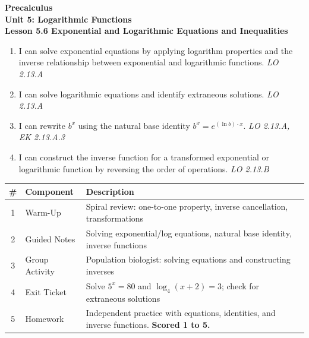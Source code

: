 \documentclass[10pt]{article}
\begin{document}
\vspace{-0.8in}

\begin{center}
  {\color{white}\textbf{\LARGE Precalculus}}\\[4pt]
  {\color{skymid}\large\textbf{Unit 5: Logarithmic Functions}}\\[6pt]
  {\color{white}\textbf{\large Lesson 5.6 \quad Exponential and Logarithmic Equations and Inequalities}}
\end{center}

\vspace{0.22in}
\namedateperiod
\vspace{0.18in}

\begin{learningtargetbox}
\small
\begin{enumerate}[leftmargin=1.5em, itemsep=5pt]
  \item I can solve exponential equations by applying logarithm properties and the inverse
        relationship between exponential and logarithmic functions.
        \hfill\textit{LO 2.13.A}
  \item I can solve logarithmic equations and identify extraneous solutions.
        \hfill\textit{LO 2.13.A}
  \item I can rewrite $b^x$ using the natural base identity $b^x = e^{(\ln b)\cdot x}$.
        \hfill\textit{LO 2.13.A, EK 2.13.A.3}
  \item I can construct the inverse function for a transformed exponential or logarithmic
        function by reversing the order of operations.
        \hfill\textit{LO 2.13.B}
\end{enumerate}
\end{learningtargetbox}

\vspace{0.14in}

\begin{tocbox}
\small
\renewcommand{\arraystretch}{1.5}
\begin{tabularx}{\linewidth}{@{} c l X @{}}
\rowcolor{sky}
\textbf{\#} & \textbf{Component} & \textbf{Description} \\
\midrule
1 & Warm-Up        & Spiral review: one-to-one property, inverse cancellation, transformations \\
2 & Guided Notes   & Solving exponential/log equations, natural base identity, inverse functions \\
3 & Group Activity & Population biologist: solving equations and constructing inverses \\
4 & Exit Ticket    & Solve $5^x = 80$ and $\log_4(x+2)=3$; check for extraneous solutions \\
5 & Homework       & Independent practice with equations, identities, and inverse functions. \textbf{Scored 1 to 5.} \\
\end{tabularx}
\end{tocbox}
\end{document}
